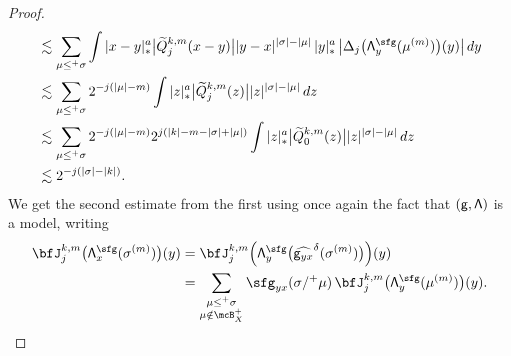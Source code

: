\begin{proof}
\begin{align*}
&\lesssim\sum_{\mu\le^+\sigma}\int |x-y|_*^a \big|\widetilde{Q}_j^{k,m}(x-y)\big| |y-x|^{|\sigma|-|\mu|}\,|y|_*^a\,\big|\Delta_j\bigl({\sf\Lambda}^{\sfg}_y(\mu^{(m)})\bigr)(y)\big|\,dy \\
&\lesssim\sum_{\mu\le^+\sigma}2^{-j(|\mu|-m)} \int |z|_*^a\big|\widetilde{Q}_j^{k,m}(z)\big| |z|^{|\sigma|-|\mu|}\,dz \\
&\lesssim\sum_{\mu\le^+\sigma}2^{-j(|\mu|-m)}2^{j(|k|-m-|\sigma|+|\mu|)} \int |z|_*^a\big|\widetilde{Q}_0^{k,m}(z)\big| |z|^{|\sigma|-|\mu|}\,dz \\
&\lesssim2^{-j(|\sigma|-|k|)}.
\end{align*}
We get the second estimate from the first using once again the fact that ${\sf (g,\Lambda)}$ is a model, writing
\begin{align*}
\bfJ_j^{k,m}\bigl({\sf\Lambda}^{\sfg}_x(\sigma^{(m)})\bigr)(y) &= \bfJ_j^{k,m}\Bigl({\sf\Lambda}^{\sfg}_y\bigl(\widehat{{\sf g}_{yx}}^\delta (\sigma^{(m)})\bigr)\Bigr)(y)\\
&= \sum_{\substack{\mu\le^+\sigma\\\mu\notin\mcB_X^+}}\sfg_{yx}(\sigma/^+\mu)\,\bfJ_j^{k,m}\bigl({\sf\Lambda}^{\sfg}_y(\mu^{(m)})\bigr)(y).\qedhere
\end{align*}
\end{proof}

